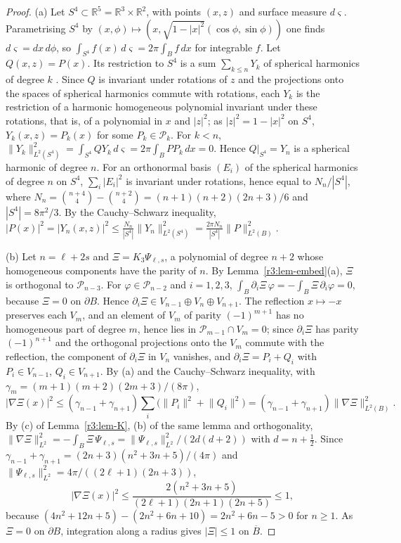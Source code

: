 \documentclass[11pt]{amsart}
\theoremstyle{definition}
\theoremstyle{remark}
\numberwithin{equation}{section}
\newcommand{\R}{\mathbb{R}}
\newcommand{\nrm}[1]{\lVert #1\rVert}
\begin{document}
\begin{proof}
(a) Let $S^4\subset\R^5=\R^3\times\R^2$, with points $(x,z)$ and surface measure $d\varsigma$. Parametrising $S^4$ by $(x,\phi)\mapsto(x,\sqrt{1-|x|^2}(\cos\phi,\sin\phi))$ one finds $d\varsigma=dx\,d\phi$, so $\int_{S^4}f(x)\,d\varsigma=2\pi\int_Bf\,dx$ for integrable $f$. Let $Q(x,z)=P(x)$. Its restriction to $S^4$ is a sum $\sum_{k\leq n}Y_k$ of spherical harmonics of degree $k$ \cite[Ch.~IV]{SW71}. Since $Q$ is invariant under rotations of $z$ and the projections onto the spaces of spherical harmonics commute with rotations, each $Y_k$ is the restriction of a harmonic homogeneous polynomial invariant under these rotations, that is, of a polynomial in $x$ and $|z|^2$; as $|z|^2=1-|x|^2$ on $S^4$, $Y_k(x,z)=P_k(x)$ for some $P_k\in\mathcal P_k$. For $k<n$, $\nrm{Y_k}^2_{L^2(S^4)}=\int_{S^4}QY_k\,d\varsigma=2\pi\int_BPP_k\,dx=0$. Hence $Q|_{S^4}=Y_n$ is a spherical harmonic of degree $n$. For an orthonormal basis $(E_i)$ of the spherical harmonics of degree $n$ on $S^4$, $\sum_i|E_i|^2$ is invariant under rotations, hence equal to $N_n/|S^4|$, where $N_n=\binom{n+4}4-\binom{n+2}4=(n+1)(n+2)(2n+3)/6$ and $|S^4|=8\pi^2/3$. By the Cauchy--Schwarz inequality, $|P(x)|^2=|Y_n(x,z)|^2\leq\frac{N_n}{|S^4|}\nrm{Y_n}^2_{L^2(S^4)}=\frac{2\pi N_n}{|S^4|}\nrm P^2_{L^2(B)}$.

(b) Let $n=\ell+2s$ and $\Xi=K_3\Psi_{\ell,s}$, a polynomial of degree $n+2$ whose homogeneous components have the parity of $n$. By Lemma~\ref{r3:lem-embed}(a), $\Xi$ is orthogonal to $\mathcal P_{n-3}$. For $\varphi\in\mathcal P_{n-2}$ and $i=1,2,3$, $\int_B\partial_i\Xi\,\varphi=-\int_B\Xi\,\partial_i\varphi=0$, because $\Xi=0$ on $\partial B$. Hence $\partial_i\Xi\in V_{n-1}\oplus V_n\oplus V_{n+1}$. The reflection $x\mapsto-x$ preserves each $V_m$, and an element of $V_m$ of parity $(-1)^{m+1}$ has no homogeneous part of degree $m$, hence lies in $\mathcal P_{m-1}\cap V_m=0$; since $\partial_i\Xi$ has parity $(-1)^{n+1}$ and the orthogonal projections onto the $V_m$ commute with the reflection, the component of $\partial_i\Xi$ in $V_n$ vanishes, and $\partial_i\Xi=P_i+Q_i$ with $P_i\in V_{n-1}$, $Q_i\in V_{n+1}$. By (a) and the Cauchy--Schwarz inequality, with $\gamma_m=(m+1)(m+2)(2m+3)/(8\pi)$,
\[
|\nabla\Xi(x)|^2\leq(\gamma_{n-1}+\gamma_{n+1})\sum_i\big(\nrm{P_i}^2+\nrm{Q_i}^2\big)=(\gamma_{n-1}+\gamma_{n+1})\nrm{\nabla\Xi}^2_{L^2(B)} .
\]
By (c) of Lemma~\ref{r3:lem-K}, (b) of the same lemma and orthogonality, $\nrm{\nabla\Xi}^2_{L^2}=-\int_B\Xi\,\Psi_{\ell,s}=\nrm{\Psi_{\ell,s}}^2_{L^2}/(2d(d+2))$ with $d=n+\frac12$. Since $\gamma_{n-1}+\gamma_{n+1}=(2n+3)(n^2+3n+5)/(4\pi)$ and $\nrm{\Psi_{\ell,s}}^2_{L^2}=4\pi/((2\ell+1)(2n+3))$,
\[
|\nabla\Xi(x)|^2\leq\frac{2(n^2+3n+5)}{(2\ell+1)(2n+1)(2n+5)}\leq1,
\]
because $(4n^2+12n+5)-(2n^2+6n+10)=2n^2+6n-5>0$ for $n\geq1$. As $\Xi=0$ on $\partial B$, integration along a radius gives $|\Xi|\leq1$ on $\overline B$.


\end{proof}
\end{document}
